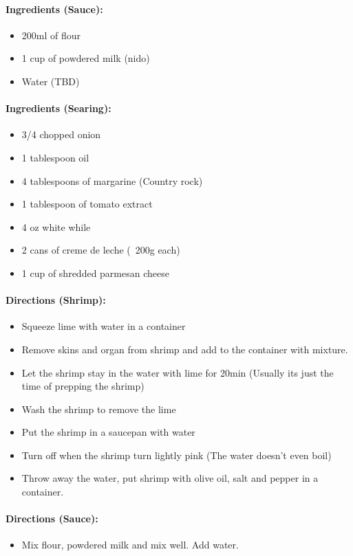 \documentclass{article}
\begin{document}
\paragraph{Ingredients (Sauce):}
\begin{itemize}
    \item 200ml of flour
    \item 1 cup of powdered milk (nido)
    \item Water (TBD)
\end{itemize}  

\paragraph{Ingredients (Searing):}
\begin{itemize}
    \item 3/4 chopped onion
    \item 1 tablespoon oil
    \item 4 tablespoons of margarine (Country rock)
    \item 1 tablespoon of tomato extract
    \item 4 oz white while
    \item 2 cans of creme de leche (~200g each)
    \item 1 cup of shredded parmesan cheese
\end{itemize}  

\paragraph{Directions (Shrimp):}
\begin{itemize}
    \item Squeeze lime with water in a container
    \item Remove skins and organ from shrimp and add to the container with mixture.
    \item Let the shrimp stay in the water with lime for 20min (Usually its just the time of prepping the shrimp)
    \item Wash the shrimp to remove the lime
    \item Put the shrimp in a saucepan with water
    \item Turn off when the shrimp turn lightly pink (The water doesn't even boil)
    \item Throw away the water, put shrimp with olive oil, salt and pepper in a container.
\end{itemize}  

\paragraph{Directions (Sauce):}
\begin{itemize}
    \item Mix flour, powdered milk and mix well. Add water.
\end{itemize}  
\end{document}
